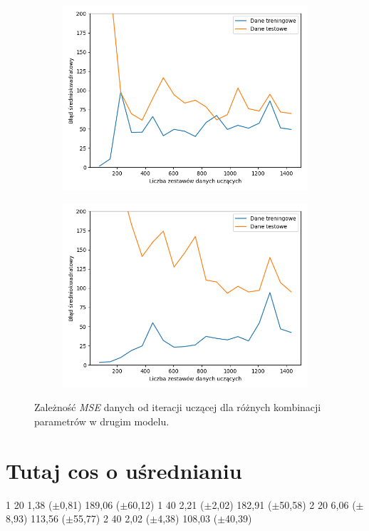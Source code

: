\documentclass[12pt]{aghdpl}
\begin{document}
\begin{figure}[h]
		 	\begin{subfigure}{.5\linewidth}
		 		\includegraphics[width =\linewidth]{wykresy/4_zwiekszenie_stopnia_skomplikowania_modelu/2_warstwy_20_neuronow_learning_curves.png}
		 	\end{subfigure}
		 	\begin{subfigure}{.5\linewidth}
		 		\includegraphics[width =\linewidth]{wykresy/4_zwiekszenie_stopnia_skomplikowania_modelu/2_warstwy_40_neuronow_learning_curves.png}
		 	\end{subfigure}
	 	
 			\caption{Zależność \textit{MSE} danych od iteracji uczącej dla różnych kombinacji parametrów w drugim modelu.}
			\label{fig: drugi_model_kombinacje_parametrow_learning_curves}
		\end{figure}
		
		\section{Tutaj cos o uśrednianiu}
1 20 1,38 ($\pm$0,81) 189,06 ($\pm$60,12)
1 40 2,21 ($\pm$2,02) 182,91 ($\pm$50,58)
2 20 6,06 ($\pm$8,93) 113,56 ($\pm$55,77)
2 40 2,02 ($\pm$4,38) 108,03 ($\pm$40,39)

		\printbibliography
\end{document}
